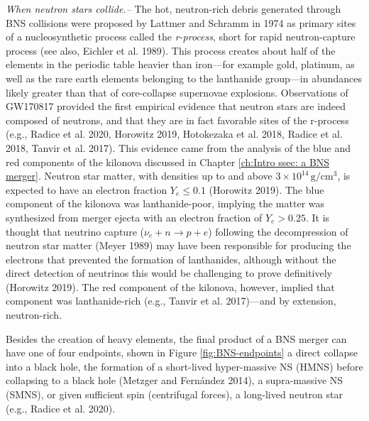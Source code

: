 \documentclass[1.5,11pt]{beavtex}
\begin{document}
\textit{When neutron stars collide.–} The hot, neutron-rich debris generated through BNS collisions were proposed by Lattmer and Schramm in 1974 as primary sites of a nucleosynthetic process called the \textit{r-process}, short for rapid neutron-capture process (see also, Eichler et al. 1989). This process creates about half of the elements in the periodic table heavier than iron---for example gold, platinum, as well as the rare earth elements belonging to the lanthanide group---in abundances likely greater than that of core-collapse supernovae explosions. Observations of GW170817 provided the first empirical evidence that neutron stars are indeed composed of neutrons, and that they are in fact favorable sites of the r-process (e.g., Radice et al. 2020, Horowitz 2019, Hotokezaka et al. 2018, Radice et al. 2018, Tanvir et al. 2017). This evidence came from the analysis of the blue and red components of the kilonova discussed in Chapter \ref{ch:Intro ssec: a BNS merger}. Neutron star matter, with densities up to and above $3 \times 10^{14} \, \mathrm{g/cm^3}$, is expected to have an electron fraction $Y_e \leq 0.1$ (Horowitz 2019). The blue component of the kilonova was lanthanide-poor, implying the matter was synthesized from merger ejecta with an electron fraction of $Y_e > 0.25$. It is thought that neutrino capture ($\nu_e + n \rightarrow p + e$) following the decompression of neutron star matter (Meyer 1989) may have been responsible for producing the electrons that prevented the formation of lanthanides, although without the direct detection of neutrinos this would be challenging to prove definitively (Horowitz 2019). The red component of the kilonova, however, implied that component was lanthanide-rich (e.g., Tanvir et al. 2017)---and by extension, neutron-rich.    

Besides the creation of heavy elements, the final product of a BNS merger can have one of four endpoints, shown in Figure \ref{fig:BNS-endpoints} a direct collapse into a black hole, the formation of a short-lived hyper-massive NS (HMNS) before collapsing to a black hole (Metzger and Fern\'{a}ndez 2014), a supra-massive NS (SMNS), or given sufficient spin (centrifugal forces), a long-lived neutron star (e.g., Radice et al. 2020).
\end{document}
